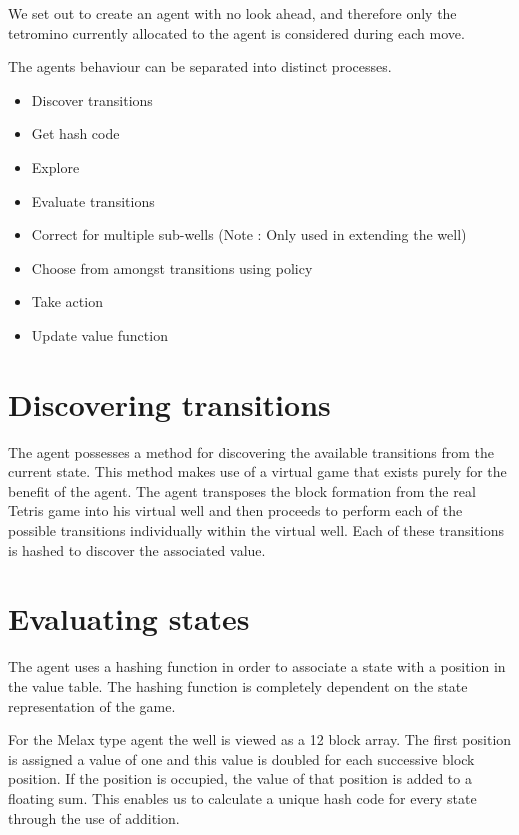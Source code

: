 \documentclass{rucsthesis}
\begin{document}
We set out to create an agent with no look ahead, and therefore only the tetromino currently allocated to the agent is considered during each move.

The agents behaviour can be separated into distinct processes.

\begin{itemize}
\item{Discover transitions}
\item{Get hash code}
\item{Explore}
\item{Evaluate transitions}
\item{Correct for multiple sub-wells (Note : Only used in extending the well) }
\item{Choose from amongst transitions using policy}
\item{Take action}
\item{Update value function}
\end{itemize}

\section{Discovering transitions}

The agent possesses a method for discovering the available transitions from the current state. This method makes use of a virtual game that exists purely for the benefit of the agent. The agent transposes the block formation from the real Tetris game into his virtual well and then proceeds to perform each of the possible transitions individually within the virtual well. Each of these transitions is hashed to discover the associated value. 

\section{Evaluating states}

The agent uses a hashing function in order to associate a state with a position in the value table. The hashing function is completely dependent on the state representation of the game.

For the Melax type agent the well is viewed as a 12 block array. The first position is assigned a value of one and this value is doubled for each successive block position. If the position is occupied, the value of that position is added to a floating sum. This enables us to calculate a unique hash code for every state through the use of addition.
\end{document}
